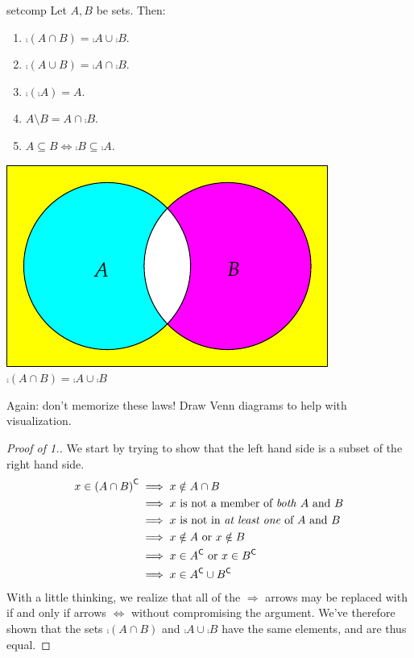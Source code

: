 \begin{minipage}[t]{0.62\linewidth}\vspace{0pt}
\begin{thm}{}{setcomp}
Let $A,B$ be sets. Then:
\begin{enumerate}\setlength{\itemsep}{0pt}
\item $\comp{(A\cap B)}=\comp A\cup \comp B$.
\item $\comp{(A\cup B)}=\comp A\cap \comp B$.
\item $\comp{(\comp A)}=A$.
\item $A\setminus B=A\cap\comp B$.
\item $A\subseteq B\iff \comp B\subseteq \comp A$.
\end{enumerate}
\end{thm}
\end{minipage}\qquad
\begin{minipage}{0.33\linewidth}\vspace{0pt}
\centering
\includegraphics[scale=1]{sets-08-venndemorgan}\\
$\comp{(A\cap B)}=\comp A\cup \comp B$
\end{minipage}\medbreak

Again: don't memorize these laws! Draw Venn diagrams to help with visualization. 

\begin{proof}[Proof of 1.]
We start by trying to show that the left hand side is a subset of the right hand side.
\begin{align*}
x\in{(A\cap B)}^{\mathsf{C}}&\implies x\notin A\cap B\\
&\implies x\text{ is not a member of \emph{both} $A$ and $B$}\\
&\implies x\text{ is not in \emph{at least one} of $A$ and $B$}\\
&\implies x\notin A\text{ or }x\notin B\\
&\implies x\in{A}^{\mathsf{C}}\text{ or }x\in{B}^{\mathsf{C}}\\
&\implies x\in{A}^{\mathsf{C}}\cup{B}^{\mathsf{C}}
\end{align*}
With a little thinking, we realize that all of the $\Longrightarrow$ arrows may be replaced with if and only if arrows $\Longleftrightarrow$ without compromising the argument. We've therefore shown that the sets $\comp{(A\cap B)}$ and $\comp A\cup \comp B$ have the same elements, and are thus equal.
\end{proof}

